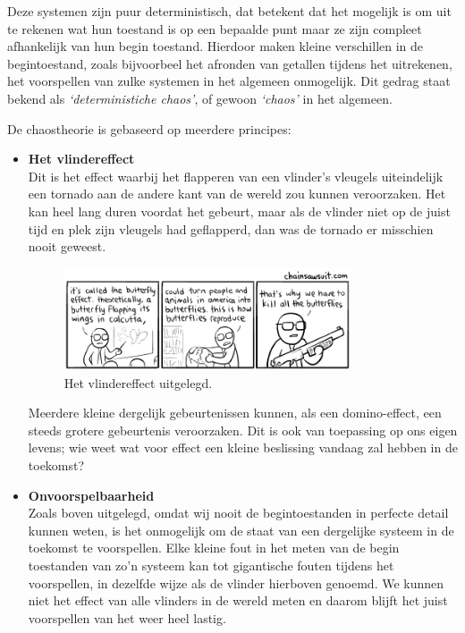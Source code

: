 \documentclass{article}
\begin{document}
Deze systemen zijn puur deterministisch, dat betekent dat het mogelijk is om uit te rekenen wat hun toestand is op een bepaalde punt maar ze zijn compleet afhankelijk van hun begin toestand. Hierdoor maken kleine verschillen in de begintoestand, zoals bijvoorbeel het afronden van getallen tijdens het uitrekenen, het voorspellen van zulke systemen in het algemeen onmogelijk. Dit gedrag staat bekend als \textit{`deterministiche chaos'}, of gewoon \textit{`chaos'} in het algemeen. 

De chaostheorie is gebaseerd op meerdere principes:

\begin{itemize}

\item{\textbf{Het vlindereffect} \\
Dit is het effect waarbij het flapperen van een vlinder's vleugels uiteindelijk een tornado aan de andere kant van de wereld zou kunnen veroorzaken. Het kan heel lang duren voordat het gebeurt, maar als de vlinder niet op de juist tijd en plek zijn vleugels had geflapperd, dan was de tornado er misschien nooit geweest. 

\begin{figure}[Hh]
	\centering
	\includegraphics[width=0.8\textwidth]{butterfly-effect.png}
	\caption{Het vlindereffect uitgelegd.}
\end{figure}

Meerdere kleine dergelijk gebeurtenissen kunnen, als een domino-effect, een steeds grotere gebeurtenis veroorzaken. Dit is ook van toepassing op ons eigen levens; wie weet wat voor effect een kleine beslissing vandaag zal hebben in de toekomst?
}

\item{\textbf{Onvoorspelbaarheid} \\
Zoals boven uitgelegd, omdat wij nooit de begintoestanden in perfecte detail kunnen weten, is het onmogelijk om de staat van een dergelijke systeem in de toekomst te voorspellen. Elke kleine fout in het meten van de begin toestanden van zo'n systeem kan tot gigantische fouten tijdens het voorspellen, in dezelfde wijze als de vlinder hierboven genoemd. We kunnen niet het effect van alle vlinders in de wereld meten en daarom blijft het juist voorspellen van het weer heel lastig.}


\end{itemize}
\end{document}
